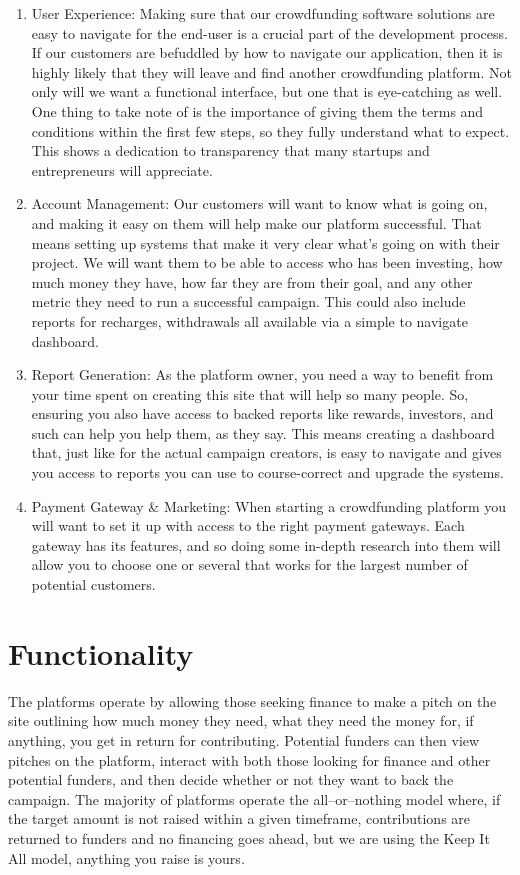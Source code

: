 \begin{enumerate}
      \item
            User Experience:
            Making sure that our crowdfunding software solutions are easy to navigate for the end-user is a crucial part of the development process. If our customers are befuddled by how to navigate our application, then it is highly likely that they will leave and find another crowdfunding platform. Not only will we want a functional interface, but one that is eye-catching as well.
            One thing to take note of is the importance of giving them the terms and conditions within the first few steps, so they fully understand what to expect. This shows a dedication to transparency that many startups and entrepreneurs will appreciate.

      \item
            Account Management:
            Our customers will want to know what is going on, and making it easy on them will help make our platform successful. That means setting up systems that make it very clear what’s going on with their project. We will want them to be able to access who has been investing, how much money they have, how far they are from their goal, and any other metric they need to run a successful campaign. This could also include reports for recharges, withdrawals all available via a simple to navigate dashboard.
      \item
            Report Generation:
            As the platform owner, you need a way to benefit from your time spent on creating this site that will help so many people. So, ensuring you also have access to backed reports like rewards, investors, and such can help you help them, as they say. This means creating a dashboard that, just like for the actual campaign creators, is easy to navigate and gives you access to reports you can use to course-correct and upgrade the systems.
      \item
            Payment Gateway \& Marketing:
            When starting a crowdfunding platform you will want to set it up with access to the right payment gateways. Each gateway has its features, and so doing some in-depth research into them will allow you to choose one or several that works for the largest number of potential customers.
\end{enumerate}



\section{Functionality}
The platforms operate by allowing those seeking finance to make a pitch on the site outlining how much money they need, what they need the money for, if anything, you get in return for contributing. Potential funders can then view pitches on the platform, interact with both those looking for finance and other potential funders, and then decide whether or not they want to back the campaign. The majority of platforms operate the all–or–nothing model where, if the target amount is not raised within a given timeframe, contributions are returned to funders and no financing goes ahead, but we are using the Keep It All model, anything you raise is yours.

